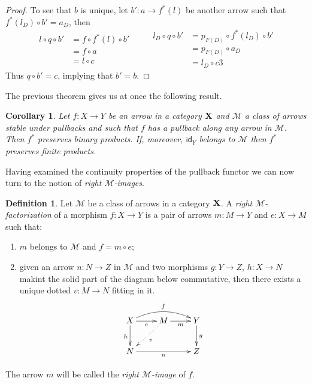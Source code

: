 \documentclass[a4paper]{article}
\newcommand{\id}[1]{\mathsf{id}_{#1}}
\def\X{\textbf {\textup{X}}}
\newtheorem{corollary}[theorem]{Corollary}
\theoremstyle{definition}
\newtheorem{definition}[theorem]{Definition}
\begin{document}
\begin{proof}
To see that $b$ is unique, let $b'\colon a\to f^*(l)$ be another arrow such that $f^*(l_D)\circ b' =a_D$, then
\[\begin{split}
l\circ q \circ b'&=f\circ f^*(l)\circ b'\\&=f\circ a\\&=l\circ c
\end{split} \qquad \begin{split}
l_D\circ q \circ b'&=p_{F(D)}\circ f^*(l_D)\circ b'\\&=p_{F(D)}\circ a_D\\&=l_D\circ c
3\end{split}\]
Thus $q\circ b'=c$, implying that $b'=b$.
\end{proof}

The previous theorem gives us at once the following result.

\begin{corollary} \label{cor:finlim}
 Let $f\colon X\to Y$ be an arrow in a category $\X$ and $\mathcal{M}$ a class of arrows stable under pullbacks and such that $f$ has a pullback along any arrow in $\mathcal{M}$. Then $f^*$ preserves binary products. If, moreover, $\id{Y}$ belongs to $\mathcal{M}$ then $f^*$ preserves finite products.
\end{corollary}

Having examined the continuity properties of the pullback functor we can now turn to the notion of \emph{right $\mathcal{M}$-images}.

\begin{definition}
Let $\mathcal{M}$ be a class of arrows in a category $\X$. A \emph{right $\mathcal{M}$-factorization
} of a morphism $f\colon X\to Y$ is a pair of arrows $m\colon M\to Y$ and $e\colon X\to M$ such that:
\begin{enumerate}
	\item $m$ belongs to $\mathcal{M}$ and $f=m\circ e$;
	\item given an arrow $n\colon N\to Z$ in $\mathcal{M}$ and two morphisms $g\colon Y\to Z$, $h\colon X\to N$ makint the solid part of the diagram below commutative, then there exists a unique dotted $v\colon M\to N$ fitting in it.
	\[\xymatrix{X \ar[r]_-{e} \ar@/^.4cm/[rr]^{f} \ar[d]_{h}& M \ar[r]_-{m} \ar@{.>}[dl]^{v} & Y \ar[d]^{g}\\N \ar[rr]_{n} && Z}\] 
\end{enumerate}  

The arrow $m$ will be called the \emph{right $\mathcal{M}$-image} of $f$.
\end{definition}
\end{document}
